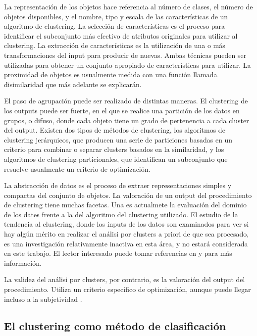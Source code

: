\documentclass{article}
\begin{document}
La representación de los objetos hace referencia al número de clases, el número de objetos disponibles, y el nombre, tipo y escala de las características de un algoritmo de clustering. La selección de características es el proceso para identificar el subconjunto más efectivo de atributos originales para utilizar al clustering. La extracción de características es la utilización de una o más transformaciones del input para producir de nuevas. Ambas técnicas pueden ser utilizadas para obtener un conjunto apropiado de características para utilizar. La proximidad de objetos es usualmente medida con una función llamada disimilaridad que más adelante se explicarán.

El paso de agrupación puede ser realizado de distintas maneras. El clustering de los outputs puede ser fuerte, en el que se realice una partición de los datos en grupos, o difuso, donde cada objeto tiene un grado de pertenencia a cada cluster del output. Existen dos tipos de métodos de clustering, los algoritmos de clustering jerárquicos, que producen una serie de particiones basadas en un criterio para combinar o separar clusters basados en la similaridad, y los algoritmos de clustering particionales, que identifican un subconjunto que resuelve usualmente un criterio de optimización.

La abstracción de datos es el proceso de extraer representaciones simples y compactas del conjunto de objetos. La valoración de un output del procedimiento de clustering tiene muchas facetas. Una es actualmete la evaluación del dominio de los dates frente a la del algoritmo del clustering utilizado. El estudio de la tendencia al clustering, donde los inputs de los datos son examinados para ver si hay algún mérito en realizar el análisi por clusters a priori de que sea procesado, es una investigación relativamente inactiva en esta área, y no estará considerada en este trabajo. El lector interesado puede tomar referencias en \cite{dub87} y \cite{che} para más información.

La validez del análisi por clusters, por contrario, es la valoración del output del procedimiento. Utiliza un criterio específico de optimización, aunque puede llegar incluso a la subjetividad \cite{dub93}.





\subsection{El clustering como método de clasificación}
\end{document}
